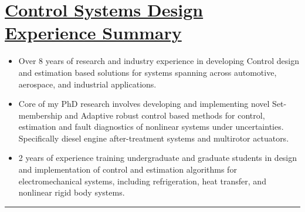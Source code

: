 \section*{\underline{Control Systems Design Experience Summary}}
\begin{itemize}
        \item Over 8 years of research and industry experience in developing Control design and estimation based solutions for systems spanning across automotive, aerospace, and industrial applications.
        \item Core of my PhD research involves developing and implementing novel Set-membership and Adaptive robust control based methods for control, estimation and fault diagnostics of nonlinear systems under uncertainties. Specifically diesel engine after-treatment systems and multirotor actuators.
        \item 2 years of experience training undergraduate and graduate students in design and implementation of control and estimation algorithms for electromechanical systems, including refrigeration, heat transfer, and nonlinear rigid body systems.
\end{itemize}

\noindent\rule{\textwidth}{0.4pt}
